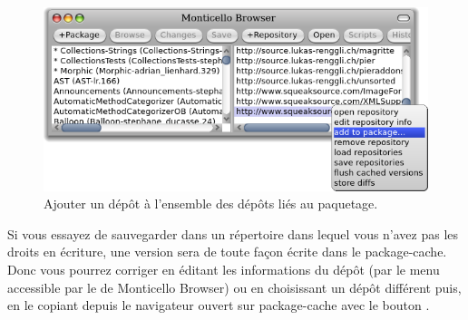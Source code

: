 \documentclass[a4paper,10pt,twoside]{book}
\begin{document}
\begin{figure}[tbp]
	\begin{center}
		\includegraphics[width=\textwidth]{MCaddToPackage}
	\end{center}
	\caption{Ajouter un d\'ep\^ot \`a l'ensemble des d\'ep\^ots li\'es
au paquetage.}
	\label{fig:associateRepository}
\end{figure}

Si vous essayez de sauvegarder dans un r\'epertoire dans lequel vous n'avez
pas les droits en \'ecriture, une version sera de toute fa\c{c}on \'ecrite
dans le package-cache.
Donc vous pourrez corriger en \'editant les informations du d\'ep\^ot
(par le menu accessible par le  de Monticello Browser) ou
en choisissant un d\'ep\^ot diff\'erent puis, en le copiant
depuis le navigateur ouvert sur package-cache avec le bouton .
\end{document}
